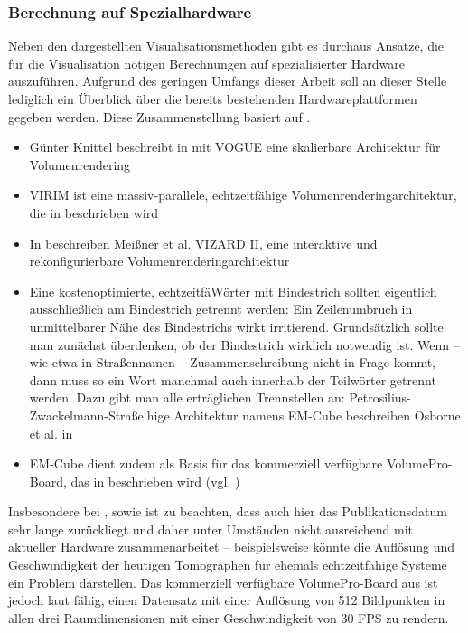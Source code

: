 \documentclass[ngerman,pdftex,paper=A4,DIV=calc,titlepage,12pt]{scrartcl}
\newtheorem[L]{boxedDefinition}{Definition}
\begin{document}
\subsubsection{Berechnung auf Spezialhardware}\label{sssec:specialhardwarecalculation}
Neben den dargestellten Visualisationsmethoden gibt es durchaus Ansätze, die für die Visualisation nötigen Berechnungen auf spezialisierter Hardware auszuführen. Aufgrund des geringen Umfangs dieser Arbeit soll an dieser Stelle lediglich ein Überblick über die bereits bestehenden Hardwareplattformen gegeben werden. Diese Zusammenstellung basiert auf \cite[Kapitel 2.5.5, Seite 14]{Bruckner2004}.
\begin{itemize}
 \item Günter Knittel beschreibt in \cite{Knittel1995} mit VOGUE eine skalierbare Architektur für Volumenrendering
 \item VIRIM ist eine massiv-parallele, echtzeitfähige Volumenrenderingarchitektur, die in \cite{Guenther1995} beschrieben wird
 \item In \cite{Meissner2002} beschreiben Meißner et al. VIZARD II, eine interaktive und rekonfigurierbare Volumenrenderingarchitektur
 \item Eine kostenoptimierte, echtzeitfäWörter mit Bindestrich sollten eigentlich ausschließlich am Bindestrich getrennt werden: Ein Zeilenumbruch in unmittelbarer Nähe des Bindestrichs wirkt irritierend. Grundsätzlich sollte man zunächst überdenken, ob der Bindestrich wirklich notwendig ist. Wenn – wie etwa in Straßennamen – Zusammenschreibung nicht in Frage kommt, dann muss so ein Wort manchmal auch innerhalb der Teilwörter getrennt werden. Dazu gibt man alle erträglichen Trennstellen an: Petro\-silius-Zwackel\-mann-Straße.hige Architektur namens EM-Cube beschreiben Osborne et al. in \cite{Osborne1997}
 \item EM-Cube dient zudem als Basis für das kommerziell verfügbare VolumePro-Board, das in \cite{Pfister1999} beschrieben wird (vgl. \cite[Kapitel 2.2.5, Seite 14]{Bruckner2004})
\end{itemize}
Insbesondere bei \cite{Knittel1995}, \cite{Guenther1995} sowie \cite{Osborne1997} ist zu beachten, dass auch hier das Publikationsdatum sehr lange zurückliegt und daher unter Umständen nicht ausreichend mit aktueller Hardware zusammenarbeitet -- beispielsweise könnte die Auflösung und Geschwindigkeit der heutigen Tomographen für ehemals echtzeitfähige Systeme ein Problem darstellen. Das kommerziell verfügbare VolumePro-Board aus \cite{Pfister1999} ist jedoch laut \cite[Kapitel 2.2.5, Seite 14]{Bruckner2004} fähig, einen Datensatz mit einer Auflösung von 512 Bildpunkten in allen drei Raumdimensionen mit einer Geschwindigkeit von 30 FPS zu rendern.
\end{document}
